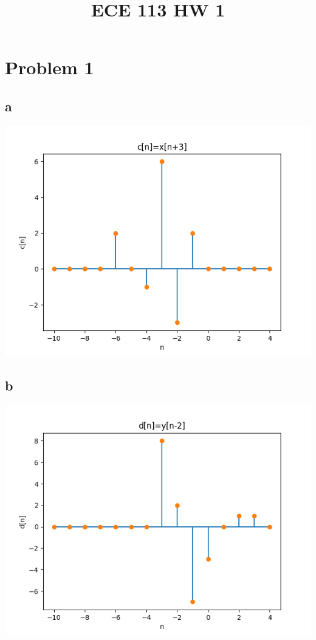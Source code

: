 
\title{ECE 113 HW 1}

\maketitle
\section{Problem 1}
\subsection{a}
\includegraphics[scale=0.5]{c.png}
\subsection{b}
\includegraphics[scale=0.5]{d.png}
